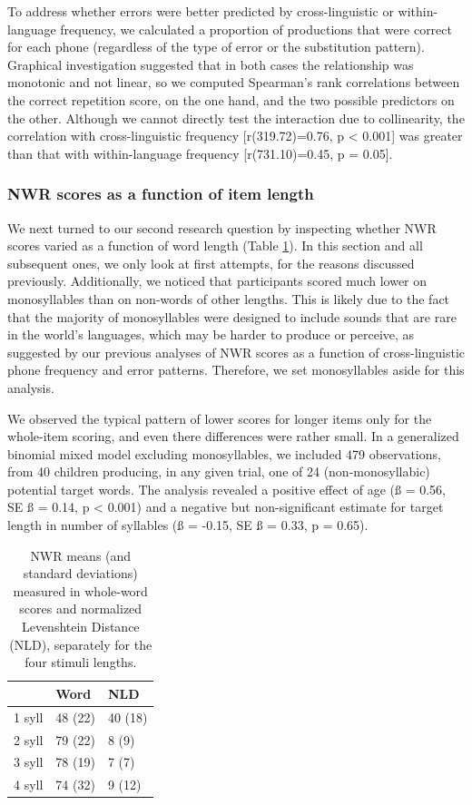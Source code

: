 \documentclass[english,,man,floatsintext]{apa6}
\begin{document}
To address whether errors were better predicted by cross-linguistic or within-language frequency, we calculated a proportion of productions that were correct for each phone (regardless of the type of error or the substitution pattern). Graphical investigation suggested that in both cases the relationship was monotonic and not linear, so we computed Spearman's rank correlations between the correct repetition score, on the one hand, and the two possible predictors on the other. Although we cannot directly test the interaction due to collinearity, the correlation with cross-linguistic frequency {[}r(319.72)=0.76, p \textless{} 0.001{]} was greater than that with within-language frequency {[}r(731.10)=0.45, p = 0.05{]}.

\hypertarget{nwr-scores-as-a-function-of-item-length}{%
\subsubsection{NWR scores as a function of item length}\label{nwr-scores-as-a-function-of-item-length}}

We next turned to our second research question by inspecting whether NWR scores varied as a function of word length (Table \ref{tab:tablength}). In this section and all subsequent ones, we only look at first attempts, for the reasons discussed previously. Additionally, we noticed that participants scored much lower on monosyllables than on non-words of other lengths. This is likely due to the fact that the majority of monosyllables were designed to include sounds that are rare in the world's languages, which may be harder to produce or perceive, as suggested by our previous analyses of NWR scores as a function of cross-linguistic phone frequency and error patterns. Therefore, we set monosyllables aside for this analysis.

We observed the typical pattern of lower scores for longer items only for the whole-item scoring, and even there differences were rather small. In a generalized binomial mixed model excluding monosyllables, we included 479 observations, from 40 children producing, in any given trial, one of 24 (non-monosyllabic) potential target words. The analysis revealed a positive effect of age (ß = 0.56, SE ß = 0.14, p \textless{} 0.001) and a negative but non-significant estimate for target length in number of syllables (ß = -0.15, SE ß = 0.33, p = 0.65).

\begin{table}

\caption{\label{tab:tablength}NWR means (and standard deviations) measured in whole-word scores and normalized Levenshtein Distance (NLD), separately for the four stimuli lengths.}
\centering
\begin{tabular}[t]{lll}
\toprule
  & Word & NLD\\
\midrule
1 syll & 48 (22) & 40 (18)\\
2 syll & 79 (22) & 8 (9)\\
3 syll & 78 (19) & 7 (7)\\
4 syll & 74 (32) & 9 (12)\\
\bottomrule
\end{tabular}
\end{table}
\end{document}
